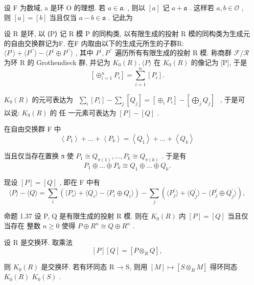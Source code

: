 \documentclass[]{article}
\begin{document}
{设 F 为数域, a 是环 O 的理想. 若 $a \in { \mathfrak { a } } .$ , 则以 $[ a ]$ 记 $a + { \mathfrak { a } }$ . 这样若 $a , b \in { \mathcal { O } }$ , 则 $[ a ] = [ b ]$ 当且仅当 $a - b \in { \mathfrak { a } }$ . 记此为 

设 R 是环, 以 ⟨P⟩ 记 R 模 P 的同构类, 以有限生成的投射 R 模的同构类为生成元 的自由交换群记为F. 在F 内取由以下的生成元所生的子群R: $\langle P ^ { \prime } \rangle + \langle P ^ { \prime \prime } \rangle - \langle P ^ { \prime } \oplus P ^ { \prime \prime } \rangle$ , 其中 $P ^ { \prime } , P ^ { \prime \prime }$ 遍历所有有限生成的投射 R 模. 称商群 $\mathcal { F } / \mathcal { R }$ 为环 R 的 Grothendieck 群, 并记为 $K _ { 0 } ( R ) . \ \langle P \rangle$ 在 $K _ { 0 } ( R )$ 的像记为 [P], 于是 $$
[ \oplus_ {i = 1} ^ {n} P _ {i} ] = \sum_ {i = 1} ^ {n} [ P _ {i} ].
$$

$K _ { 0 } ( R )$ 的元可表达为 $\begin{array} { r } { \sum _ { i } [ P _ { i } ] - \sum _ { j } [ Q _ { j } ] = [ \oplus _ { i } P _ { i } ] - [ \bigoplus _ { j } Q _ { j } ] } \end{array}$ , 于是可以说: $K _ { 0 } ( R )$ 的 任 一元素可表达为 $[ P ] - [ Q ]$ . 

在自由交换群 F 中$$
\left\langle P _ {1} \right\rangle + \dots + \left\langle P _ {k} \right\rangle = \left\langle Q _ {1} \right\rangle + \dots + \left\langle Q _ {k} \right\rangle
$$

当且仅当存在置换 π 使 $P _ { 1 } \cong Q _ { \pi ( 1 ) } , . . . , P _ { k } \cong Q _ { \pi ( k ) }$ . 于是有 $$
P _ {1} \oplus \dots \oplus P _ {k} \cong Q _ {1} \oplus \dots \oplus Q _ {k}.
$$ 

现设 $[ P ] = [ Q ]$ , 即在 F 中有 $$
\langle P \rangle - \langle Q \rangle = \sum_ {i} (\langle P _ {i} \rangle + \langle Q _ {i} \rangle - \langle P _ {i} \oplus Q _ {i} \rangle) - \sum_ {j} (\langle P _ {j} ^ {\prime} \rangle + \langle Q _ {j} ^ {\prime} \rangle - \langle P _ {j} ^ {\prime} \oplus Q _ {j} ^ {\prime} \rangle),
$$

命题 1.37 设 P, Q 是有限生成的投射 R 模. 则在 $K _ { 0 } ( R )$ 内 $[ P ] = [ Q ]$ 当且仅当存在 整数 $n \geqslant 0$ 使得 $P \oplus R ^ { n } \cong Q \oplus R ^ { n }$ . 

设 R 是交换环. 取乘法 $$
[ P ] [ Q ] = [ P \otimes_ {R} Q ],
$$

则 $K _ { 0 } ( R )$ 是交换环. 若有环同态 R → S, 则用 $[ M ] \mapsto [ S \otimes _ { R } M ]$ 得环同态 $K _ { 0 } ( R ) $ $K _ { 0 } ( S )$ . 

}
\end{document}
